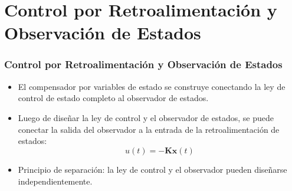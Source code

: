 \documentclass[aspectratio=169,handout]{beamer}
\theoremstyle{definition}
\theoremstyle{plain}
\theoremstyle{remark}
\begin{document}
\section{Control por Retroalimentación y Observación de Estados}
\begin{frame}[<+->]\frametitle{Control por Retroalimentación y Observación de Estados}
	\begin{itemize}
			\item El compensador por variables de estado se construye conectando la ley de control de estado completo al observador de estados.
			\item Luego de diseñar la ley de control y el observador de estados, se puede conectar la salida del observador a la entrada de la retroalimentación de estados:
			\begin{equation}
				u(t) = -\mathbf{K}\hat{\mathbf{x}}(t)
				\label{eq:controlLawObserver}
			\end{equation}
			\item Principio de separación: la ley de control y el observador pueden diseñarse independientemente.
		\end{itemize}	
\end{frame}
\end{document}
